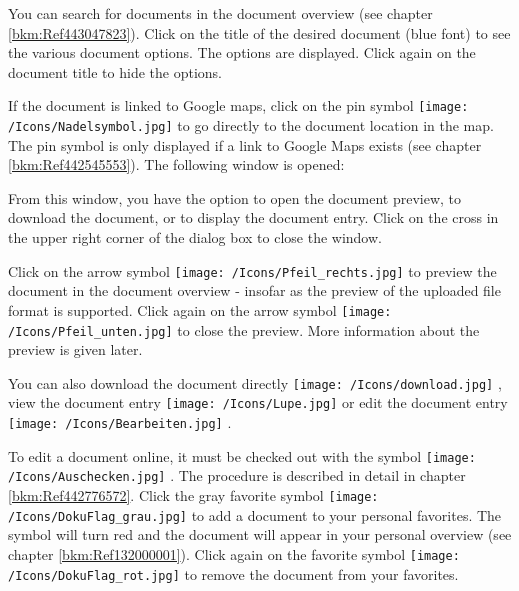 You can search for documents in the document overview (see chapter \ref{bkm:Ref443047823}). Click on the title of the desired document (blue font)  to see the various document options. The options are displayed. Click again on the document title to hide the options. \newline

If the document is linked to Google maps, click on the pin symbol \texttt{[image: /Icons/Nadelsymbol.jpg]}  to go directly to the document location in the map. The pin symbol is only displayed if a link to Google Maps exists (see chapter \ref{bkm:Ref442545553}). The following window is opened:

\begin{figure}[H]
\end{figure}

From this window, you have the option to open the document preview, to download the document, or to display the document entry. Click on the cross in the upper right corner of the dialog box to close the window. \newline

Click on the arrow symbol \texttt{[image: /Icons/Pfeil\_rechts.jpg]}  to preview the document in the document overview - insofar as the preview of the uploaded file format is supported. Click again on the arrow symbol \texttt{[image: /Icons/Pfeil\_unten.jpg]} to close the preview. More information about the preview is given later. \newline

You can also download the document directly \texttt{[image: /Icons/download.jpg]} , view the document entry \texttt{[image: /Icons/Lupe.jpg]}  or edit the document entry \texttt{[image: /Icons/Bearbeiten.jpg]} . \newline

To edit a document online, it must be checked out with the symbol \texttt{[image: /Icons/Auschecken.jpg]} . The procedure is described in detail in chapter \ref{bkm:Ref442776572}. Click the gray favorite symbol \texttt{[image: /Icons/DokuFlag\_grau.jpg]}  to add a document to your personal favorites. The symbol will turn red and the document will appear in your personal overview (see chapter \ref{bkm:Ref132000001}). Click again on the favorite symbol \texttt{[image: /Icons/DokuFlag\_rot.jpg]} to remove the document from your favorites. \newline


